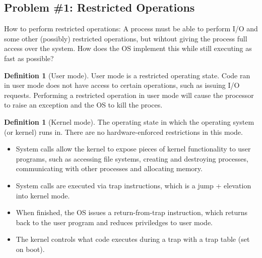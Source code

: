 \documentclass[11pt, a4paper]{article}
\theoremstyle{definition}
\newtheorem{definition}[theorem]{Definition}
\theoremstyle{remark}
\begin{document}
\subsection{Problem \#1: Restricted Operations}
How to perform restricted operations: A process must be able to perform I/O and some other (possibly) restricted operations, but wihtout giving the process full access over the system. How does the OS implement this while still executing as fast as possible?
\begin{definition}[User mode]
User mode is a restricted operating state. Code ran in user mode does not have access to certain operations, such as issuing I/O requests. Performing a restricted operation in user mode will cause the processor to raise an exception and the OS to kill the proces.
\end{definition}
\begin{definition}[Kernel mode]
The operating state in which the operating system (or kernel) runs in. There are no hardware-enforced restrictions in this mode. 
\end{definition}
\begin{itemize}
  \item System calls allow the kernel to expose pieces of kernel functionality to user programs, such as accessing file systems, creating and destroying processes, communicating with other processes and allocating memory.
  \item System calls are executed via trap instructions, which is a jump + elevation into kernel mode.
  \item When finished, the OS issues a return-from-trap instruction, which returns back to the user program and reduces priviledges to user mode.
  \item The kernel controls what code executes during a trap with a trap table (set on boot).
\end{itemize}
\end{document}
